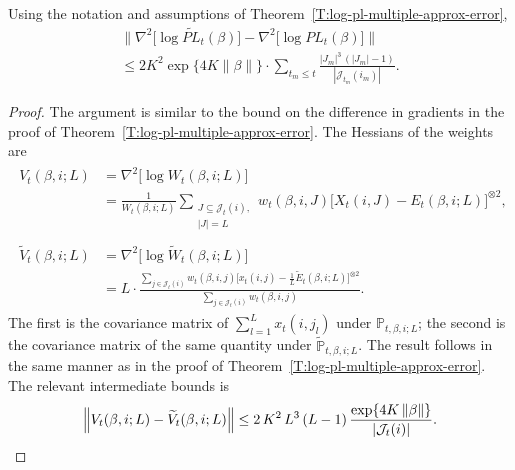 \documentclass[aoas,preprint]{imsart}
\begin{document}
\begin{lemma}\label{L:hessian-approx-bound}
Using the notation and assumptions of 
Theorem~\ref{T:log-pl-multiple-approx-error},
\begin{multline*}
    \Big\|
        \nabla^2\big[ \log \widetilde{\mathit{PL}}_t(\beta) \big]
        -
        \nabla^2\big[ \log \mathit{PL}_t(\beta) \big]
    \Big\| \\
        \leq
            2K^2
            \exp\{4 K \| \beta \|\}
            \cdot
            \sum_{t_m \leq t}
                \frac{|J_m|^3 \, (|J_m| - 1)}{|\mathcal{J}_{t_m}(i_m)|}.
\end{multline*}    
\end{lemma}
\begin{proof}
The argument is similar to the bound on the difference in gradients in
the proof of Theorem~\ref{T:log-pl-multiple-approx-error}.  The Hessians of 
the weights are
\begin{align}
    \begin{split}
    V_t(\beta,i;L)
        &=
        \nabla^2 \big[  \log W_t(\beta, i; L) \big] \\
        &=
        \frac{1}{W_t(\beta,i;L)}
        \sum_{\substack{J \subseteq \mathcal{J}_t(i), \\
                        |J| = L}}
            w_t(\beta,i,J)
            \Big[
                X_t(i,J)
                -
                E_t(\beta,i;L)
            \Big]^{\otimes 2},
    \end{split} \\
    \begin{split}
    \widetilde V_t(\beta,i;L)
        &=
        \nabla^2 \big[ \log \widetilde W_t(\beta,i;L) \big] \\
        &=
        L
        \cdot
        \frac{
            \sum_{j \in \mathcal{J}_t(i)}
                w_t(\beta, i, j)
                \Big[ x_t(i,j) - \tfrac{1}{L} \widetilde E_t(\beta,i;L) \Big]^{\otimes 2}
        }{
            \sum_{j \in \mathcal{J}_t(i)}
                w_t(\beta, i, j)
        }.
    \end{split}
\end{align}
The first is the covariance matrix of $\sum_{l=1}^L x_t(i,j_l)$ under
$\mathbb{P}_{t,\beta,i;L}$; the second is the covariance matrix of the same
quantity under $\tilde{\mathbb{P}}_{t,\beta,i;L}$.
The result follows in the same manner as in the proof of 
Theorem~\ref{T:log-pl-multiple-approx-error}.
The relevant intermediate bounds is
\[
    \Big\| V_{t}(\beta, i; L) - \widetilde{V}_t(\beta, i; L) \Big\|
        \leq
        2\, K^2 \, L^3 \, (L - 1)
        \,
        \frac{\exp\{4 K \, \| \beta \|\}}{| \mathcal{J}_t(i) |}.
    \qedhere
\]
\end{proof}
\end{document}
